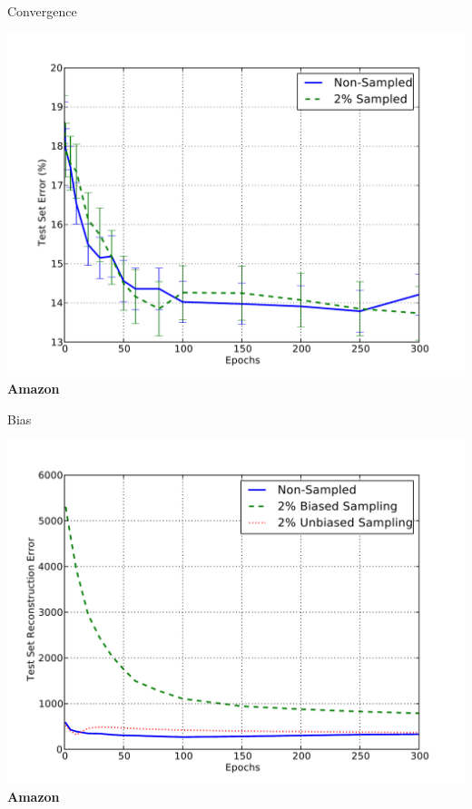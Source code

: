 \documentclass{beamer}
\begin{document}
\begin{frame}{Convergence}
\begin{center}
\begin{minipage}{.7\textwidth}
\begin{center}
  \includegraphics[width=.95\textwidth]{images/amazon_convergence.pdf}\\
  {\bf Amazon}
\end{center}
\end{minipage}
\end{center}
\end{frame}

\begin{frame}{Bias}
\begin{center}
\begin{minipage}{.7\textwidth}
\begin{center}
  \includegraphics[width=.95\textwidth]{images/amazon_bias.pdf}\\
  {\bf Amazon}
\end{center}
\end{minipage}
\end{center}
\end{frame}
\end{document}
